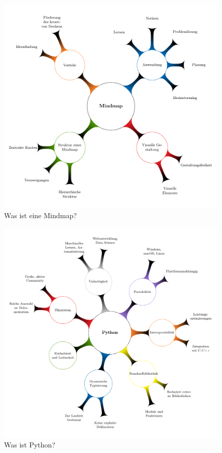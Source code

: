 \documentclass{vorlage-design-main}
\begin{document}
\begin{figure}
\centering
\includegraphics[keepaspectratio]{images/Mindmap.pdf}
\caption{Was ist eine Mindmap?}
\end{figure}

\begin{figure}
\centering
\includegraphics[keepaspectratio]{images/Mindmap-Python.pdf}
\caption{Was ist Python?}
\end{figure}


\clearpage
\printbibliography
\end{document}
